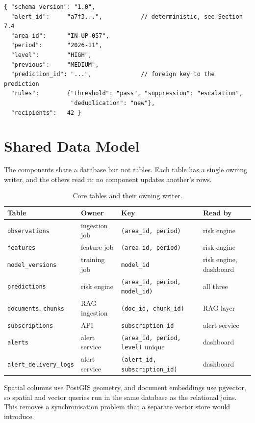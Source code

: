 \documentclass[10pt,openany]{report}
\begin{document}
\begin{verbatim}
{ "schema_version": "1.0",
  "alert_id":     "a7f3...",           // deterministic, see Section 7.4
  "area_id":      "IN-UP-057",
  "period":       "2026-11",
  "level":        "HIGH",
  "previous":     "MEDIUM",
  "prediction_id": "...",              // foreign key to the prediction
  "rules":        {"threshold": "pass", "suppression": "escalation",
                   "deduplication": "new"},
  "recipients":   42 }
\end{verbatim}

\section{Shared Data Model}

The components share a database but not tables. Each table has a single owning writer, and the
others read it; no component updates another's rows.

\begin{table}[htbp]
\centering
\caption{Core tables and their owning writer.}
\label{tab:tables}
\small
\begin{tabular}{@{}p{3.5cm}p{2.5cm}p{4.0cm}p{2.4cm}@{}}
\toprule
\textbf{Table} & \textbf{Owner} & \textbf{Key} & \textbf{Read by} \\
\midrule
\texttt{observations} & ingestion job & \texttt{(area\_id, period)} & risk engine \\
\texttt{features} & feature job & \texttt{(area\_id, period)} & risk engine \\
\texttt{model\_versions} & training job & \texttt{model\_id} & risk engine, dashboard \\
\texttt{predictions} & risk engine & \texttt{(area\_id, period, model\_id)} & all three \\
\texttt{documents}, \texttt{chunks} & RAG ingestion & \texttt{(doc\_id, chunk\_id)} & RAG layer \\
\texttt{subscriptions} & API & \texttt{subscription\_id} & alert service \\
\texttt{alerts} & alert service & \texttt{(area\_id, period, level)} unique & dashboard \\
\texttt{alert\_delivery\_logs} & alert service & \texttt{(alert\_id, subscription\_id)} & dashboard \\
\bottomrule
\end{tabular}
\end{table}

Spatial columns use PostGIS geometry, and document embeddings use pgvector, so spatial and vector
queries run in the same database as the relational joins. This removes a synchronisation problem
that a separate vector store would introduce.
\end{document}
